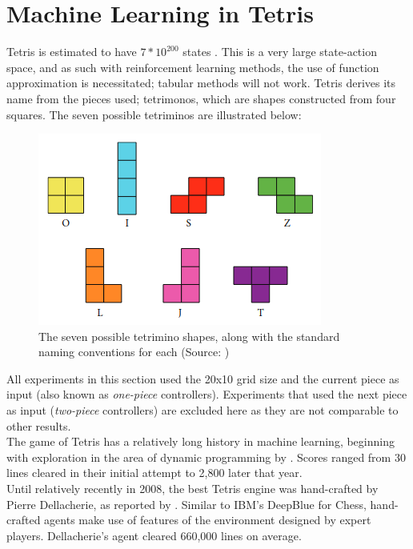 \documentclass[12pt]{article}
\begin{document}
\section{Machine Learning in Tetris}\label{mltetty}
Tetris is estimated to have $7*10^{200}$ states \autocite{algorta2019game}. This is a very large state-action space, and as such with reinforcement learning methods, the use of function approximation is necessitated; tabular methods will not work. Tetris derives its name from the pieces used; tetrimonos, which are shapes constructed from four squares. The seven possible tetriminos are illustrated below:
\begin{figure}[H]
    \centering
    \includegraphics[scale=0.7]{16.png}
    \caption{The seven possible tetrimino shapes, along with the standard naming conventions for each (Source: \textcite{lewis2015generalisation})}
    \label{tetriminos}
\end{figure}
All experiments in this section used the 20x10 grid size and the current piece as input (also known as \textit{one-piece} controllers). Experiments that used the next piece as input (\textit{two-piece} controllers) are excluded here as they are not comparable to other results.\\\newline The game of Tetris has a relatively long history in machine learning, beginning with exploration in the area of dynamic programming by \textcite{tsitsiklis1996feature,bertsekas1996neuro}. Scores ranged from 30 lines cleared in their initial attempt to 2,800 later that year. \\\newline
Until relatively recently in 2008, the best Tetris engine was hand-crafted by Pierre Dellacherie, as reported by \textcite{fahey}. Similar to IBM's DeepBlue \autocite{campbell2002deep} for Chess, hand-crafted agents make use of features of the environment designed by expert players. Dellacherie's agent cleared 660,000 lines on average. \\\newline
\end{document}
